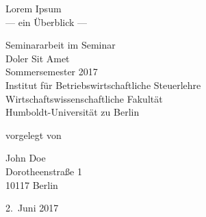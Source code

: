 




\begin{titlepage}
  \begin{center}

  \mbox{}
  \vspace{-1mm}

  {\huge Lorem Ipsum \\[1em] {\LARGE — ein Überblick —}}

  \vspace{1.5cm}


  \vspace{1mm}

  \hfill

  Seminararbeit im Seminar \\
  {\large \sc Doler Sit Amet} \\
  Sommersemester 2017 \\
  Institut für Betriebswirtschaftliche Steuerlehre \\
  Wirtschaftswissenschaftliche Fakultät \\
  Humboldt-Universität zu Berlin

  \vspace{1.5cm}

  vorgelegt von

  \vspace{1em}

  {\Large John Doe} \\
  Dorotheenstraße 1 \\
  10117 Berlin \\

  \vspace{2em}

  2.~Juni 2017
  \end{center}
\end{titlepage}
\newpage
\tableofcontents
\newpage
{}

